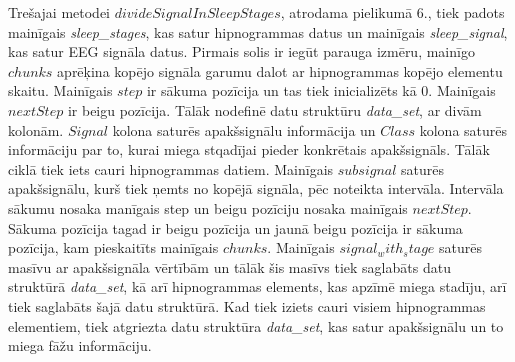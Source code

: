 \documentclass[12pt,paper=A4]{report}
\begin{document}
%    

 Trešajai metodei $divideSignalInSleepStages$, atrodama pielikumā 6., tiek padots mainīgais \textit{sleep_stages}, kas satur hipnogrammas datus un mainīgais \textit{sleep_signal}, kas satur EEG signāla datus. Pirmais solis ir iegūt parauga izmēru, mainīgo $chunks$ aprēķina kopējo signāla garumu dalot ar hipnogrammas kopējo elementu skaitu. Mainīgais $step$ ir sākuma pozīcija un tas tiek inicializēts kā 0. Mainīgais $nextStep$ ir beigu pozīcija. Tālāk nodefinē datu struktūru \textit{data_set}, ar divām kolonām. $Signal$ kolona saturēs apakšsignālu informācija un $Class$ kolona saturēs informāciju par to, kurai miega stqadījai pieder konkrētais apakšsignāls. Tālāk ciklā tiek iets cauri hipnogrammas datiem. Mainīgais $subsignal$ saturēs apakšsignālu, kurš tiek ņemts no kopējā signāla, pēc noteikta intervāla. Intervāla sākumu nosaka manīgais step un beigu pozīciju nosaka mainīgais $nextStep$. Sākuma pozīcija tagad ir beigu pozīcija un jaunā beigu pozīcija ir sākuma pozīcija, kam pieskaitīts mainīgais $chunks$. Mainīgais $signal_with_stage$ saturēs masīvu ar apakšsignāla vērtībām un tālāk šis masīvs tiek saglabāts datu struktūrā \textit{data_set}, kā arī hipnogrammas elements, kas apzīmē miega stadīju, arī tiek saglabāts šajā datu struktūrā. Kad tiek iziets cauri visiem hipnogrammas elementiem, tiek atgriezta datu struktūra \textit{data_set}, kas satur apakšsignālu un to miega fāžu informāciju.

\end{document}
